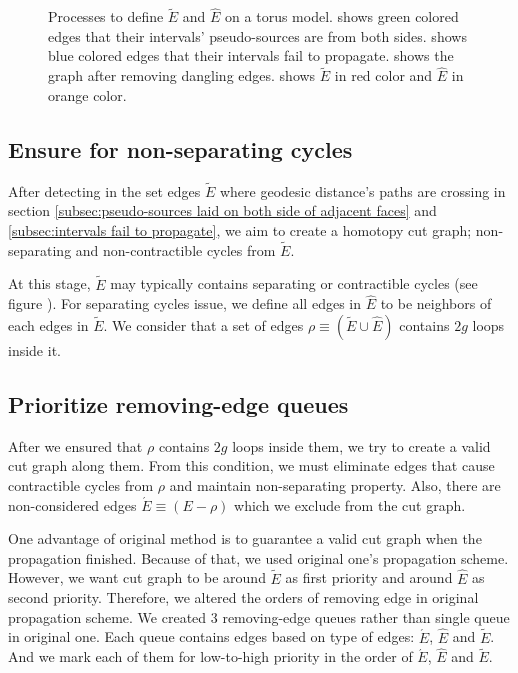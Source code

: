 \documentclass[a4paper,twoside]{article}
\begin{document}
\begin{figure}[h!]
	\caption[]{Processes to define $\tilde{E}$ and $\hat{E}$ on a torus model.  shows green colored edges that their intervals' pseudo-sources are from both sides.  shows blue colored edges that their intervals fail to propagate.  shows the graph after removing dangling edges.  shows $\tilde{E}$ in red color and $\hat{E}$ in orange color.}
	\label{fig:fig-torus_edges_detected}
\end{figure}

\subsection{Ensure for non-separating cycles}
\label{subsec:ensure non-trivia}
After detecting in the set edges $\tilde{E}$ where geodesic distance's paths are crossing in section \ref{subsec:pseudo-sources laid on both side of adjacent faces} and \ref{subsec:intervals fail to propagate}, we aim to create a homotopy cut graph; non-separating and non-contractible cycles from $\tilde{E}$.

At this stage, $\tilde{E}$ may typically contains separating or contractible cycles (see figure ).  For separating cycles issue, we define all edges in $\hat{E}$ to be neighbors of each edges in $\tilde{E}$. We consider that a set of edges $\rho \equiv (\tilde{E} \cup \hat{E})$ contains $2g$ loops inside it.  

\subsection{Prioritize removing-edge queues}
After we ensured that $\rho$ contains $2g$ loops inside them, we try to create a valid cut graph along them. From this condition, we must eliminate edges that cause contractible cycles from $\rho$ and maintain non-separating property. Also, there are non-considered edges $\acute{E} \equiv (E - \rho)$ which we exclude from the cut graph.

One advantage of original method is to guarantee a valid cut graph when the propagation finished. Because of that, we used original one's propagation scheme. However, we want cut graph to be around $\tilde{E}$ as first priority and around $\hat{E}$ as second priority. Therefore, we altered the orders of removing edge in original propagation scheme. We created 3 removing-edge queues rather than single queue in original one. Each queue contains edges based on type of edges: 
$\acute{E}$, $\hat{E}$ and $\tilde{E}$.  And we mark each of them for low-to-high priority in the order of $\acute{E}$, $\hat{E}$ and $\tilde{E}$.
\end{document}
